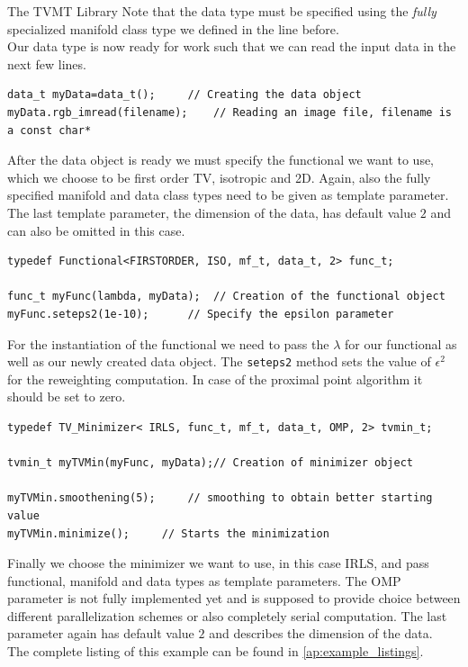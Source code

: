 \begin{chapter}{The TVMT Library}
Note that the data type must be specified using the \textit{fully} specialized manifold class type we defined in the line before.\\
Our data type is now ready for work such that we can read the input data in the next few lines.\\

\cppinline
\begin{lstlisting}[label=code:tut_data,caption={Initialization and input of image data}]
data_t myData=data_t();		// Creating the data object
myData.rgb_imread(filename);	// Reading an image file, filename is a const char*
\end{lstlisting}

After the data object is ready we must specify the functional we want to use, which we choose to be first order TV, isotropic and 2D. Again,
also the fully specified manifold and data class types need to be given as template parameter. The last template parameter, the dimension of the data, 
has default value $2$ and can also be omitted in this case.\\

\cppinline
\begin{lstlisting}[label=code:tut_func,caption={Defining the functional and setting parameters}]
typedef Functional<FIRSTORDER, ISO, mf_t, data_t, 2> func_t;

func_t myFunc(lambda, myData);  // Creation of the functional object
myFunc.seteps2(1e-10);		// Specify the epsilon parameter 
\end{lstlisting}

For the instantiation of the functional we need to pass the $\lambda$ for our functional as well as our newly created data object. The \texttt{seteps2} method
sets the value of $\epsilon^2$ for the reweighting computation. In case of the proximal point algorithm it should be set to zero.\\

\cppinline
\begin{lstlisting}[label=code:tut_data,caption={Choosing the minimizer, smoothing and minimization}]
typedef TV_Minimizer< IRLS, func_t, mf_t, data_t, OMP, 2> tvmin_t;

tvmin_t myTVMin(myFunc, myData);// Creation of minimizer object

myTVMin.smoothening(5);		// smoothing to obtain better starting value
myTVMin.minimize();		// Starts the minimization
\end{lstlisting}

Finally we choose the minimizer we want to use, in this case IRLS, and pass functional, manifold and data types as template parameters. The OMP parameter is not fully implemented yet 
and is supposed to provide choice between different parallelization schemes or also completely serial computation. The last parameter again has default value $2$ and describes the 
dimension of the data.\\
The complete listing of this example can be found in \ref{ap:example_listings}.


\end{chapter}

